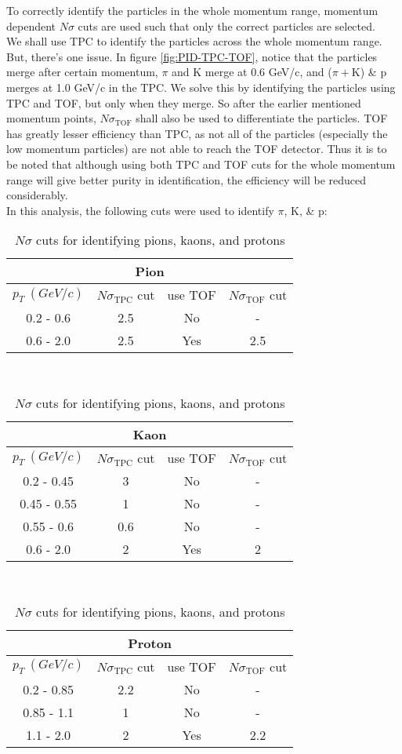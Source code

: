 \documentclass[12pt,a4paper,twoside]{report}
\begin{document}
To correctly identify the particles in the whole momentum range, momentum dependent $N\sigma$ cuts are used such that only the correct particles are selected.\\
We shall use TPC to identify the particles across the whole momentum range. But, there's one issue. In figure \ref{fig:PID-TPC-TOF}, notice that the particles merge after certain momentum, $\pi$ and K merge at 0.6 GeV/c, and ($\pi+\mathrm{K}$) \& p merges at 1.0 GeV/c in the TPC. We solve this by identifying the particles using TPC and TOF, but only when they merge. So after the earlier mentioned momentum points, $N\sigma_\mathrm{TOF}$ shall also be used to differentiate the particles. TOF has greatly lesser efficiency than TPC, as not all of the particles (especially the low momentum particles) are not able to reach the TOF detector. Thus it is to be noted that although using both TPC and TOF cuts for the whole momentum range will give better purity in identification, the efficiency will be reduced considerably.
\\
In this analysis, the following cuts were used to identify $\pi$, K, \& p:\\
\begin{table}[H]
	\centering
	\begin{tabular}{|c|c|c|c|}
		\hline
		\multicolumn{4}{|c|}{Pion} \\
		\hline
		$p_T\ (GeV/c)$ & $N\sigma_\mathrm{TPC}$ cut & use TOF & $N\sigma_\mathrm{TOF}$ cut \\
		\hline
		0.2 - 0.6 & 2.5 & No & - \\
		0.6 - 2.0 & 2.5 & Yes & 2.5 \\
		\hline
	\end{tabular}
\\\vspace*{1cm}
	\begin{tabular}{|c|c|c|c|}
		\hline
		\multicolumn{4}{|c|}{Kaon} \\
		\hline
		$p_T\ (GeV/c)$ & $N\sigma_\mathrm{TPC}$ cut & use TOF & $N\sigma_\mathrm{TOF}$ cut \\
		\hline
		0.2 - 0.45 & 3 & No & - \\
		0.45 - 0.55 & 1 & No & - \\
		0.55 - 0.6 & 0.6 & No & -\\
		0.6 - 2.0 & 2 & Yes & 2 \\
		\hline
	\end{tabular}
\\\vspace*{1cm}
	\begin{tabular}{|c|c|c|c|}
		\hline
		\multicolumn{4}{|c|}{Proton} \\
		\hline
		$p_T\ (GeV/c)$ & $N\sigma_\mathrm{TPC}$ cut & use TOF & $N\sigma_\mathrm{TOF}$ cut \\
		\hline
		0.2 - 0.85 & 2.2 & No & - \\
		0.85 - 1.1 & 1 & No & - \\
		1.1 - 2.0 & 2 & Yes & 2.2 \\
		\hline
	\end{tabular}
\caption{\label{tbl:pidcuts}$N\sigma$ cuts for identifying pions, kaons, and protons}
\end{table}
\end{document}
